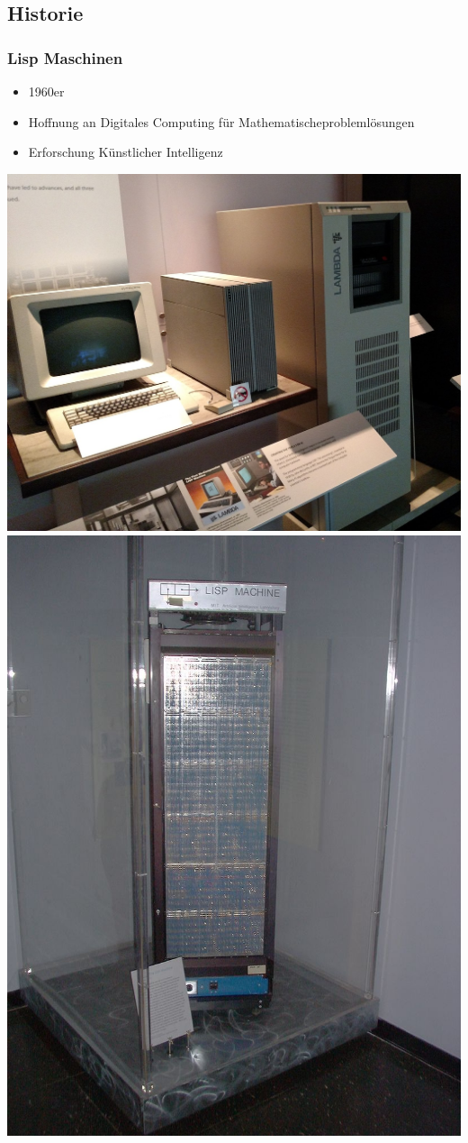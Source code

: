\documentclass{beamer}
\begin{document}
\begin{frame}
	\section{Historie}
\frametitle{Lisp Maschinen}
	\begin{itemize}
            \item 1960er
            \item Hoffnung an Digitales Computing für Mathematischeproblemlösungen 
            \item Erforschung Künstlicher Intelligenz
	\end{itemize}
	  
	\includegraphics[scale=0.08]{bilder/lispm1.jpg}
	  \includegraphics[scale=0.3]{bilder/lispm.jpg}

\end{frame}
\end{document}
